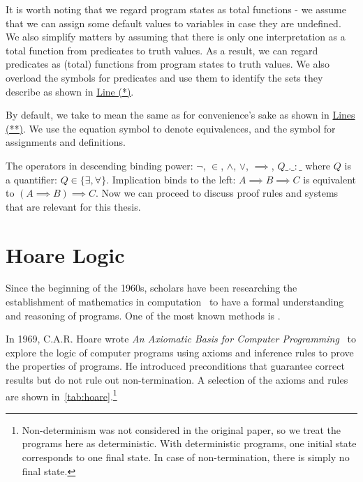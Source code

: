 It is worth noting that we regard program states as total functions - we assume that we can assign some default values to variables in case they are undefined. 
We also simplify matters by assuming that there is only one interpretation as a total function from predicates to truth values. 
As a result, we can regard predicates as (total) functions from program states to truth values. 
We also overload the symbols for predicates and use them to identify the sets they describe as shown in \hyperlink{2.*}{Line (*)}. 

By default, we take  to mean the same as  for convenience's sake as shown in \hyperlink{2.**}{Lines (**)}. 
We use the equation symbol \mathl{=} to denote equivalences, and the symbol \mathl{:=} for assignments and definitions. 

The operators in descending binding power: $\neg$, $\in$, $\wedge$, $\vee$, ${\implies}$, $Q\_.\_:\_$ where $Q$ is a quantifier: $Q\in\{\exists, \forall\}$. Implication binds to the left: $A{\implies} B{\implies} C$ is equivalent to $(A{\implies} B){\implies} C$.
Now we can proceed to discuss proof rules and systems that are relevant for this thesis. 




\section{Hoare Logic}\label{sec:hoare}
Since the beginning of the 1960s, scholars have been researching the establishment of mathematics in computation~\cite{floyd93, mccarthy93} to have a formal understanding and reasoning of programs. 
One of the most known methods is . 

In 1969, C.A.R. Hoare wrote \textit{An Axiomatic Basis for Computer Programming}~\cite{hoare69} to explore the logic of computer programs using axioms and inference rules to prove the properties of programs. 
He introduced  preconditions that  guarantee correct results but do not rule out non-termination. 
A selection of the axioms and rules are shown in~\autoref{tab:hoare}.\footnote{Non-determinism was not considered in the original paper, so we treat the programs here as deterministic. 
With deterministic programs, one initial state corresponds to one final state.
In case of non-termination, there is simply no final state. }

